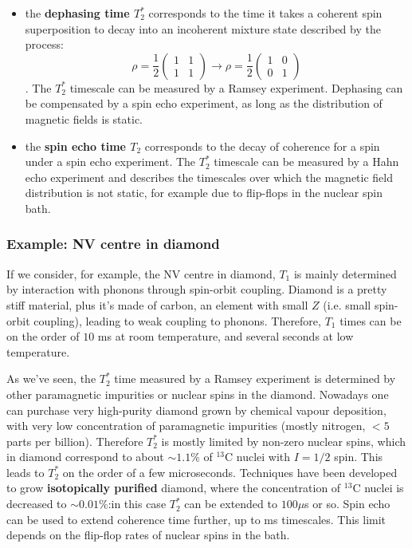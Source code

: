 \documentclass[a4paper,11pt]{article}
\begin{document}
\begin{itemize}
    \item the {\bf dephasing time $T_2^*$} corresponds to the time it takes a coherent  spin superposition to decay into an incoherent mixture state described by the process:
    \begin{equation}
    \rho = \frac{1}{2}\left(\begin{array}{cc}
        1 & 1\\
        1 & 1\end{array} \right) 
        \longrightarrow 
        \rho = \frac{1}{2} \left(\begin{array}{cc}
        1 & 0\\
        0 & 1\end{array} \right) 
    \end{equation}.
    The $T_2^*$ timescale can be measured by a Ramsey experiment. Dephasing can be compensated by a spin echo experiment, as long as the distribution of magnetic fields is static.

    \item the {\bf spin echo time $T_2$} corresponds to the decay of coherence for a spin under a spin echo experiment. The $T_2^*$ timescale can be measured by a Hahn echo experiment and describes the timescales over which the magnetic field distribution is not static, for example due to flip-flops in the nuclear spin bath.
    
    \end{itemize}
    
\subsubsection{Example: NV centre in diamond}
If we consider, for example, the NV centre in diamond, $T_1$ is mainly determined by interaction with phonons through spin-orbit coupling. Diamond is a pretty stiff material, plus it's made of carbon, an element with small $Z$ (i.e. small spin-orbit coupling), leading to weak coupling to phonons. Therefore, $T_1$ times can be on the order of $10$ ms at room temperature, and several seconds at low temperature.

As we've seen, the $T_2^*$ time measured by a Ramsey experiment is determined by other paramagnetic impurities or nuclear spins in the diamond. Nowadays one can purchase very high-purity diamond grown by chemical vapour deposition, with very low concentration of paramagnetic impurities (mostly nitrogen, $<5$ parts per billion). Therefore $T_2^*$ is mostly limited by non-zero nuclear spins, which in diamond correspond to about $\sim 1.1\%$ of $^{13}$C nuclei with $I=1/2$ spin. This leads to $T_2^*$ on the order of a few microseconds. Techniques have been developed to grow {\bf isotopically purified} diamond, where the concentration of $^{13}$C nuclei is decreased to $\sim 0.01\%$:in this case $T_2^*$ can be extended to $100 \mu$s or so.
\newline Spin echo can be used to extend coherence time further, up to ms timescales. This limit depends on the flip-flop rates of nuclear spins in the bath.
\end{document}
